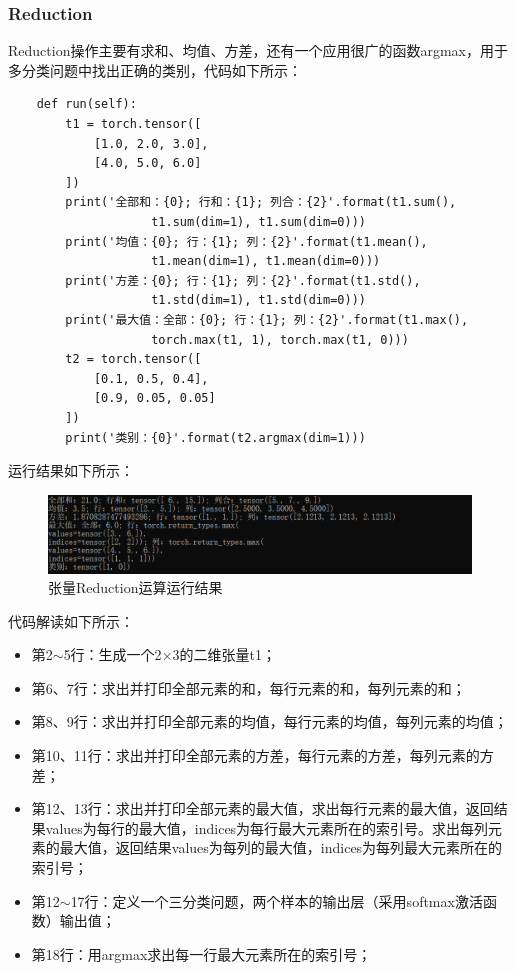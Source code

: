 \documentclass[UTF8]{article}
\begin{document}
\subsubsection{Reduction}
Reduction操作主要有求和、均值、方差，还有一个应用很广的函数argmax，用于多分类问题中找出正确的类别，代码如下所示：
\begin{lstlisting}
    def run(self):
        t1 = torch.tensor([
            [1.0, 2.0, 3.0],
            [4.0, 5.0, 6.0]
        ])
        print('全部和：{0}; 行和：{1}; 列合：{2}'.format(t1.sum(), 
                    t1.sum(dim=1), t1.sum(dim=0)))
        print('均值：{0}; 行：{1}; 列：{2}'.format(t1.mean(), 
                    t1.mean(dim=1), t1.mean(dim=0)))
        print('方差：{0}; 行：{1}; 列：{2}'.format(t1.std(), 
                    t1.std(dim=1), t1.std(dim=0)))
        print('最大值：全部：{0}; 行：{1}; 列：{2}'.format(t1.max(), 
                    torch.max(t1, 1), torch.max(t1, 0)))
        t2 = torch.tensor([
            [0.1, 0.5, 0.4],
            [0.9, 0.05, 0.05]
        ])
        print('类别：{0}'.format(t2.argmax(dim=1)))
\end{lstlisting}
运行结果如下所示：
\begin{figure}[H]
	\caption{张量Reduction运算运行结果}
	\label{f000007}
	\centering
	\includegraphics[width=15cm]{images/f000007}
\end{figure}
代码解读如下所示：
\begin{itemize}
\item 第2$\sim$5行：生成一个2$\times$3的二维张量t1；
\item 第6、7行：求出并打印全部元素的和，每行元素的和，每列元素的和；
\item 第8、9行：求出并打印全部元素的均值，每行元素的均值，每列元素的均值；
\item 第10、11行：求出并打印全部元素的方差，每行元素的方差，每列元素的方差；
\item 第12、13行：求出并打印全部元素的最大值，求出每行元素的最大值，返回结果values为每行的最大值，indices为每行最大元素所在的索引号。求出每列元素的最大值，返回结果values为每列的最大值，indices为每列最大元素所在的索引号；
\item 第12$\sim$17行：定义一个三分类问题，两个样本的输出层（采用softmax激活函数）输出值；
\item 第18行：用argmax求出每一行最大元素所在的索引号；
\end{itemize}
\end{document}
